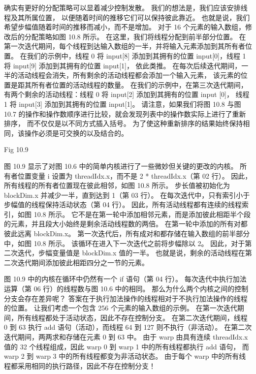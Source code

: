 确实有更好的分配策略可以显着减少控制发散。 我们的想法是，我们应该安排线程及其所属位置，
以便随着时间的推移它们可以保持彼此靠近。 也就是说，我们希望步幅值随着时间的推移而减小，而不是增加。 
对于 16 个元素的输入数组，修改后的分配策略如图 10.8 所示。 在这里，我们将线程分配到前半部分位置。 
在第一次迭代期间，每个线程到达输入数组的一半，并将输入元素添加到其所有者位置。 
在我们的示例中，线程 0 将 input[8] 添加到其拥有的位置 input[0]，线程 1 将 input[9] 添加到其拥有的位置 input[1]，
依此类推。 在每次后续迭代期间，一半的活动线程会消失，所有剩余的活动线程都会添加一个输入元素，
该元素的位置是距其所有者位置的活动线程的数量。 
在我们的示例中，在第三次迭代期间，有两个剩余的活动线程：线程 0 将 input[2] 添加到其拥有的位置 input [0]，
线程 1 将 input[3] 添加到其拥有的位置 input[1]。 
请注意，如果我们将图 10.8 与图 10.7 的操作和操作数顺序进行比较，就会发现列表中的操作数实际上进行了重新排序，
而不仅仅是以不同方式插入括号。 为了使这种重新排序的结果始终保持相同，该操作必须是可交换的以及结合的。

{\color{red} Fig 10.9}

图 10.9 显示了对图 10.6 中的简单内核进行了一些微妙但关键的更改的内核。 
所有者位置变量 i 设置为 threadIdx.x，而不是 2 * threadIdx.x（第 02 行）。 
因此，所有线程的所有者位置现在彼此相邻，如图 10.8 所示。 
步长值被初始化为 blockDim.x 并减少一半，直到达到 1（第 03 行）。 
在每次迭代中，只有索引小于步幅值的线程保持活动状态（第 04 行）。 因此，所有活动线程都有连续的线程索引，如图 10.8 所示。 
它不是在第一轮中添加相邻元素，而是添加彼此相距半个段的元素，并且段大小始终是剩余活动线程数的两倍。 
在第一轮中添加的所有对都彼此远离 blockDim.x。 第一次迭代后，所有成对和都存储在输入数组的前半部分中，如图 10.8 所示。 
该循环在进入下一次迭代之前将步幅除以 2。 因此，对于第二次迭代，步幅变量值是 blockDim.x 值的一半。 
也就是说，剩余的活动线程在第二次迭代期间添加彼此相距四分之一节的元素。

图 10.9 中的内核在循环中仍然有一个 if 语句（第 04 行）。 
每次迭代中执行加法运算（第 06 行）的线程数与图 10.6 中的相同。 
那么为什么两个内核之间的控制分支会存在差异呢？ 答案在于执行加法操作的线程相对于不执行加法操作的线程的位置。 
让我们考虑一个包含 256 个元素的输入数组的示例。 在第一次迭代期间，所有线程都处于活动状态，因此不存在控制分支。 
在第二次迭代期间，线程 0 到 63 执行 add 语句（活动），而线程 64 到 127 则不执行（非活动）。 
在第二次迭代期间，两两求和存储在元素 0 到 63 中。 
由于 warp 由具有连续 threadIdx.x 值的 32 个线程组成，因此 warp 0 到 warp 1 中的所有线程都执行 add 语句，
而 warp 2 到 warp 3 中的所有线程都变为非活动状态。 
由于每个 warp 中的所有线程都采用相同的执行路径，因此不存在控制分支！

